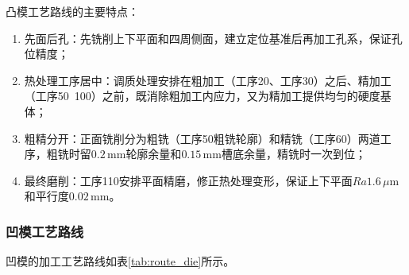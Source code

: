 \documentclass{xautCADreport}
\begin{document}
凸模工艺路线的主要特点：
\begin{enumerate}
  \item 先面后孔：先铣削上下平面和四周侧面，建立定位基准后再加工孔系，保证孔位精度；
  \item 热处理工序居中：调质处理安排在粗加工（工序20、工序30）之后、精加工（工序50~100）之前，既消除粗加工内应力，又为精加工提供均匀的硬度基体；
  \item 粗精分开：正面铣削分为粗铣（工序50粗铣轮廓）和精铣（工序60）两道工序，粗铣时留$0.2\,\mathrm{mm}$轮廓余量和$0.15\,\mathrm{mm}$槽底余量，精铣时一次到位；
  \item 最终磨削：工序110安排平面精磨，修正热处理变形，保证上下平面$Ra1.6\,\mu\mathrm{m}$和平行度$0.02\,\mathrm{mm}$。
\end{enumerate}

\subsubsection{凹模工艺路线}

凹模的加工工艺路线如表\ref{tab:route_die}所示。
\end{document}
